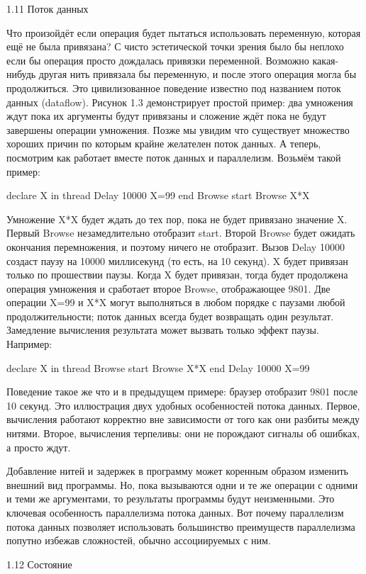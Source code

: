 1.11 Поток данных

Что произойдёт если операция будет пытаться использовать переменную, которая ещё не была привязана? С чисто эстетической точки зрения было бы неплохо если бы операция просто дождалась привязки переменной. Возможно какая-нибудь другая нить привязала бы переменную, и после этого операция могла бы продолжиться. Это цивилизованное поведение известно под названием поток данных (dataflow). Рисунок 1.3 демонстрирует простой пример: два умножения ждут пока их аргументы будут привязаны и сложение ждёт пока не будут завершены операции умножения. Позже мы увидим что существует множество хороших причин по которым крайне желателен поток данных. А теперь, посмотрим как работает вместе поток данных и параллелизм. Возьмём такой пример:

declare X in
thread {Delay 10000} X=99 end
{Browse start} {Browse X*X}

Умножение X*X будет ждать до тех пор, пока не будет привязано значение X. Первый Browse незамедлительно отобразит start. Второй Browse будет ожидать окончания перемножения, и поэтому ничего не отобразит. Вызов {Delay 10000} создаст паузу на 10000 миллисекунд (то есть, на 10 секунд). X будет привязан только по прошествии паузы. Когда X будет привязан, тогда будет продолжена операция умножения и сработает второе Browse, отображающее 9801. Две операции X=99 и X*X могут выполняться в любом порядке с паузами любой продолжительности; поток данных всегда будет возвращать один результат. Замедление вычисления результата может вызвать только эффект паузы. Например:

declare X in
thread {Browse start} {Browse X*X} end
{Delay 10000} X=99

Поведение такое же что и в предыдущем примере: браузер отобразит 9801 после 10 секунд. Это иллюстрация двух удобных особенностей потока данных. Первое, вычисления работают корректно вне зависимости от того как они разбиты между нитями. Второе, вычисления терпеливы: они не порождают сигналы об ошибках, а просто ждут.

Добавление нитей и задержек в программу может коренным образом изменить внешний вид программы. Но, пока вызываются одни и те же операции с одними и теми же аргументами, то результаты программы будут неизменными. Это ключевая особенность параллелизма потока данных. Вот почему параллелизм потока данных позволяет использовать большинство преимуществ параллелизма попутно избежав сложностей, обычно ассоциируемых с ним.

1.12 Состояние

